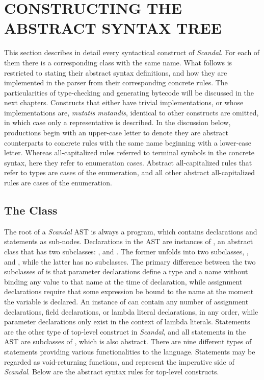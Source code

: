 \chapter{CONSTRUCTING THE ABSTRACT SYNTAX TREE}

This section describes in detail every syntactical construct of \emph{Scandal}. For each of them there is a corresponding  class with the same name. What follows is restricted to stating their abstract syntax definitions, and how they are implemented in the parser from their corresponding concrete rules. The particularities of type-checking and generating bytecode will be discussed in the next chapters. Constructs that either have trivial implementations, or whose implementations are, \emph{mutatis mutandis}, identical to other constructs are omitted, in which case only a representative is described. In the discussion below, productions begin with an upper-case letter to denote they are abstract counterparts to concrete rules with the same name beginning with a lower-case letter. Whereas all-capitalized rules referred to terminal symbols in the concrete syntax, here they refer to enumeration cases. Abstract all-capitalized rules that refer to types are cases of the  enumeration, and all other abstract all-capitalized rules are cases of the  enumeration.

\section{The  Class}

The root of a \emph{Scandal} AST is always a program, which contains declarations and statements as sub-nodes. Declarations in the AST are instances of , an abstract class that has two subclasses: , and . The former unfolds into two subclasses, , and , while the latter has no subclasses. The primary difference between the two subclasses of  is that parameter declarations define a type and a name without binding any value to that name at the time of declaration, while assignment declarations require that some expression be bound to the name at the moment the variable is declared. An instance of  can contain any number of assignment declarations, field declarations, or lambda literal declarations, in any order, while parameter declarations only exist in the context of lambda literals. Statements are the other type of top-level construct in \emph{Scandal}, and all statements in the AST are subclasses of , which is also abstract. There are nine different types of statements providing various functionalities to the language. Statements may be regarded as void-returning functions, and represent the imperative side of \emph{Scandal}. Below are the abstract syntax rules for top-level constructs.

